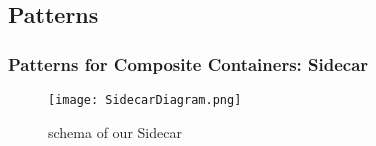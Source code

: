 \subsection{Patterns}

\begin{frame}[fragile]
  \frametitle{Patterns for Composite Containers: Sidecar}
  \begin{figure}[ht]
    \caption{schema of our Sidecar}
    \centering
    \texttt{[image: SidecarDiagram.png]}
    \label{fig:SidecarDiagram}
  \end{figure}
\end{frame}
